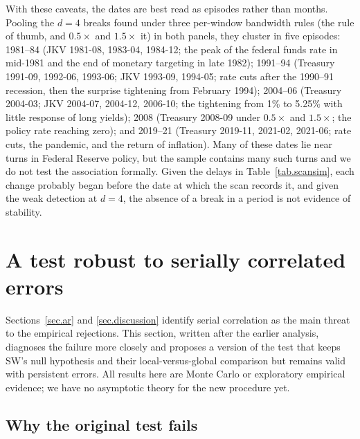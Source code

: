 \documentclass[11pt]{article}
\begin{document}
With these caveats, the dates are best read as episodes rather than months. Pooling the $d=4$ breaks found under three per-window bandwidth rules (the rule of thumb, and $0.5\times$ and $1.5\times$ it) in both panels, they cluster in five episodes: 1981--84 (JKV 1981-08, 1983-04, 1984-12; the peak of the federal funds rate in mid-1981 and the end of monetary targeting in late 1982); 1991--94 (Treasury 1991-09, 1992-06, 1993-06; JKV 1993-09, 1994-05; rate cuts after the 1990--91 recession, then the surprise tightening from February 1994); 2004--06 (Treasury 2004-03; JKV 2004-07, 2004-12, 2006-10; the tightening from 1\% to 5.25\% with little response of long yields); 2008 (Treasury 2008-09 under $0.5\times$ and $1.5\times$; the policy rate reaching zero); and 2019--21 (Treasury 2019-11, 2021-02, 2021-06; rate cuts, the pandemic, and the return of inflation). Many of these dates lie near turns in Federal Reserve policy, but the sample contains many such turns and we do not test the association formally. Given the delays in Table~\ref{tab.scansim}, each change probably began before the date at which the scan records it, and given the weak detection at $d=4$, the absence of a break in a period is not evidence of stability.

\section{A test robust to serially correlated errors}\label{sec.robust}

Sections~\ref{sec.ar} and \ref{sec.discussion} identify serial correlation as the main threat to the empirical rejections. This section, written after the earlier analysis, diagnoses the failure more closely and proposes a version of the test that keeps SW's null hypothesis and their local-versus-global comparison but remains valid with persistent errors. All results here are Monte Carlo or exploratory empirical evidence; we have no asymptotic theory for the new procedure yet.

\subsection{Why the original test fails}\label{sec.robust.why}
\end{document}

